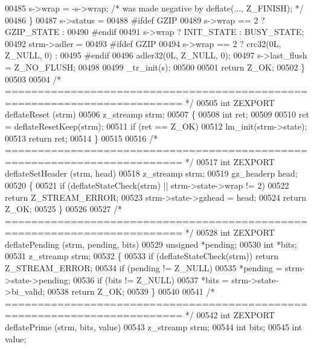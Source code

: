\begin{DoxyCode}
00485         s->wrap = -s->wrap; \textcolor{comment}{/* was made negative by deflate(..., Z\_FINISH); */}
00486     \}
00487     s->status =
00488 \textcolor{preprocessor}{#ifdef GZIP}
00489         s->wrap == 2 ? GZIP\_STATE :
00490 \textcolor{preprocessor}{#endif}
00491         s->wrap ? INIT\_STATE : BUSY\_STATE;
00492     strm->adler =
00493 \textcolor{preprocessor}{#ifdef GZIP}
00494         s->wrap == 2 ? crc32(0L, Z\_NULL, 0) :
00495 \textcolor{preprocessor}{#endif}
00496         adler32(0L, Z\_NULL, 0);
00497     s->last\_flush = Z\_NO\_FLUSH;
00498 
00499     \_tr\_init(s);
00500 
00501     \textcolor{keywordflow}{return} Z\_OK;
00502 \}
00503 
00504 \textcolor{comment}{/* ========================================================================= */}
00505 \textcolor{keywordtype}{int} ZEXPORT deflateReset (strm)
00506     z\_streamp strm;
00507 \{
00508     \textcolor{keywordtype}{int} ret;
00509 
00510     ret = deflateResetKeep(strm);
00511     \textcolor{keywordflow}{if} (ret == Z\_OK)
00512         lm\_init(strm->state);
00513     \textcolor{keywordflow}{return} ret;
00514 \}
00515 
00516 \textcolor{comment}{/* ========================================================================= */}
00517 \textcolor{keywordtype}{int} ZEXPORT deflateSetHeader (strm, head)
00518     z\_streamp strm;
00519     gz\_headerp head;
00520 \{
00521     \textcolor{keywordflow}{if} (deflateStateCheck(strm) || strm->state->wrap != 2)
00522         \textcolor{keywordflow}{return} Z\_STREAM\_ERROR;
00523     strm->state->gzhead = head;
00524     \textcolor{keywordflow}{return} Z\_OK;
00525 \}
00526 
00527 \textcolor{comment}{/* ========================================================================= */}
00528 \textcolor{keywordtype}{int} ZEXPORT deflatePending (strm, pending, bits)
00529     \textcolor{keywordtype}{unsigned} *pending;
00530     \textcolor{keywordtype}{int} *bits;
00531     z\_streamp strm;
00532 \{
00533     \textcolor{keywordflow}{if} (deflateStateCheck(strm)) \textcolor{keywordflow}{return} Z\_STREAM\_ERROR;
00534     \textcolor{keywordflow}{if} (pending != Z\_NULL)
00535         *pending = strm->state->pending;
00536     \textcolor{keywordflow}{if} (bits != Z\_NULL)
00537         *bits = strm->state->bi\_valid;
00538     \textcolor{keywordflow}{return} Z\_OK;
00539 \}
00540 
00541 \textcolor{comment}{/* ========================================================================= */}
00542 \textcolor{keywordtype}{int} ZEXPORT deflatePrime (strm, bits, value)
00543     z\_streamp strm;
00544     \textcolor{keywordtype}{int} bits;
00545     \textcolor{keywordtype}{int} value;

\end{DoxyCode}

